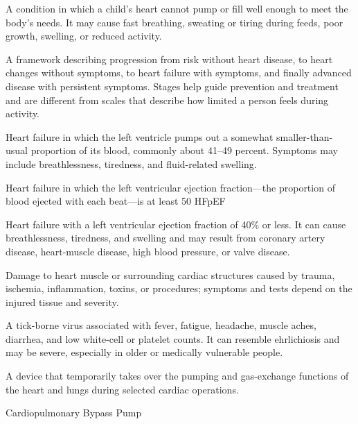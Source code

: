  A condition in which a child's heart cannot pump or fill well enough to meet the body's needs. It may cause fast breathing, sweating or tiring during feeds, poor growth, swelling, or reduced activity.

 A framework describing progression from risk without heart disease, to heart changes without symptoms, to heart failure with symptoms, and finally advanced disease with persistent symptoms. Stages help guide prevention and treatment and are different from scales that describe how limited a person feels during activity.

 Heart failure in which the left ventricle pumps out a somewhat smaller-than-usual proportion of its blood, commonly about 41--49 percent. Symptoms may include breathlessness, tiredness, and fluid-related swelling.

 Heart failure in which the left ventricular ejection fraction—the proportion of blood ejected with each beat—is at least 50%
\synonyms
HFpEF

 Heart failure with a left ventricular ejection fraction of 40\% or less. It can cause breathlessness, tiredness, and swelling and may result from coronary artery disease, heart-muscle disease, high blood pressure, or valve disease.

 Damage to heart muscle or surrounding cardiac structures caused by trauma, ischemia, inflammation, toxins, or procedures; symptoms and tests depend on the injured tissue and severity.

 A tick-borne virus associated with fever, fatigue, headache, muscle aches, diarrhea, and low white-cell or platelet counts. It can resemble ehrlichiosis and may be severe, especially in older or medically vulnerable people.

 A device that temporarily takes over the pumping and gas-exchange functions of the heart and lungs during selected cardiac operations.

\synonyms
Cardiopulmonary Bypass Pump

